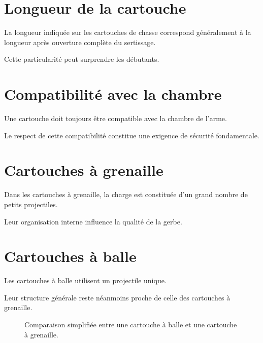 \section{Longueur de la cartouche}

La longueur indiquée sur les cartouches de chasse correspond généralement à la
longueur après ouverture complète du sertissage.

Cette particularité peut surprendre les débutants.

\section{Compatibilité avec la chambre}

Une cartouche doit toujours être compatible avec la chambre de l'arme.

Le respect de cette compatibilité constitue une exigence de sécurité
fondamentale.

\section{Cartouches à grenaille}

Dans les cartouches à grenaille, la charge est constituée d'un grand nombre de
petits projectiles.

Leur organisation interne influence la qualité de la gerbe.

\section{Cartouches à balle}

Les cartouches à balle utilisent un projectile unique.

Leur structure générale reste néanmoins proche de celle des cartouches à
grenaille.

\begin{figure}[htbp]
\centering


\caption{Comparaison simplifiée entre une cartouche à balle et une cartouche à grenaille.}
\label{fig:balle_ou_grenaille}

\end{figure}


